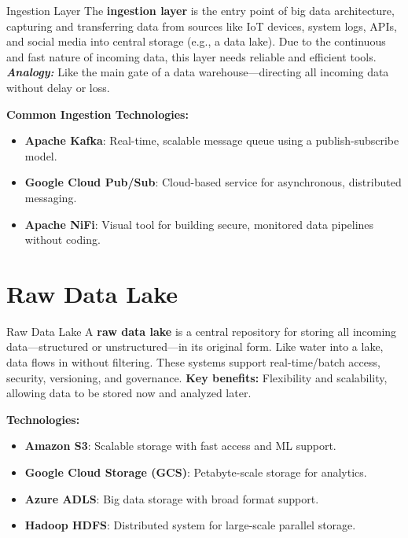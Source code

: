\documentclass[aspectratio=169, table]{beamer}
\begin{document}
	
	\begin{frame}[fragile]{Ingestion Layer}
		\vspace{20pt}
		The \textbf{ingestion layer} is the entry point of big data architecture, capturing and transferring data from sources like IoT devices, system logs, APIs, and social media into central storage (e.g., a data lake). Due to the continuous and fast nature of incoming data, this layer needs reliable and efficient tools. \textit{\textbf{Analogy:}} Like the main gate of a data warehouse—directing all incoming data without delay or loss.
		
		\vspace{6pt}
		\textbf{Common Ingestion Technologies:}
		\begin{itemize}
			\item \textbf{Apache Kafka}: Real-time, scalable message queue using a publish-subscribe model.
			\item \textbf{Google Cloud Pub/Sub}: Cloud-based service for asynchronous, distributed messaging.
			\item \textbf{Apache NiFi}: Visual tool for building secure, monitored data pipelines without coding.
		\end{itemize}
	\end{frame}
	
	

	\section{Raw Data Lake}
	
	\begin{frame}[fragile]{Raw Data Lake}
		\vspace{20pt}
		A \textbf{raw data lake} is a central repository for storing all incoming data—structured or unstructured—in its original form. Like water into a lake, data flows in without filtering. These systems support real-time/batch access, security, versioning, and governance. \textbf{Key benefits:} Flexibility and scalability, allowing data to be stored now and analyzed later.
		
		\vspace{6pt}
		\textbf{Technologies:}
		\begin{itemize}
			\item \textbf{Amazon S3}: Scalable storage with fast access and ML support.
			\item \textbf{Google Cloud Storage (GCS)}: Petabyte-scale storage for analytics.
			\item \textbf{Azure ADLS}: Big data storage with broad format support.
			\item \textbf{Hadoop HDFS}: Distributed system for large-scale parallel storage.
		\end{itemize}
	\end{frame}
	
\end{document}
